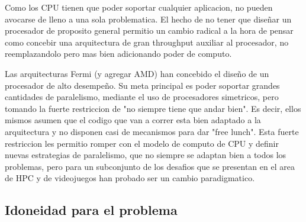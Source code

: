 Como los CPU tienen que poder soportar cualquier aplicacion, no pueden avocarse de lleno a una sola
problematica. El hecho de no tener que dise\~nar un procesador de proposito general permitio un cambio radical
a la hora de pensar como concebir una arquitectura de gran throughput auxiliar al procesador, no reemplazandolo
pero mas bien adicionando poder de computo.

Las arquitecturas Fermi (y agregar AMD) han concebido el dise\~no de un procesador de alto desempe\~no. 
Su meta principal es poder soportar grandes cantidades de paralelismo, mediante el uso de procesadores
simetricos, pero tomando la fuerte restriccion de "no siempre tiene que andar bien". Es decir, ellos
mismos asumen que el codigo que van a correr esta bien adaptado a la arquitectura y no disponen
casi de mecanismos para dar "free lunch". Esta fuerte restriccion les permitio romper con el modelo
de computo de CPU y definir nuevas estrategias de paralelismo, que no siempre se adaptan bien a todos
los problemas, pero para un subconjunto de los desafios que se presentan en el area de HPC y de videojuegos
han probado ser un cambio paradigmatico.

\subsection{Idoneidad para el problema}
